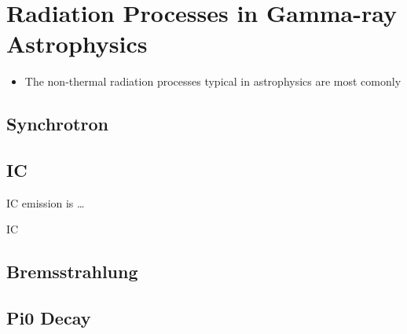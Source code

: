 
\section{Radiation Processes in Gamma-ray Astrophysics}

\begin{itemize}
  \item The non-thermal radiation processes typical
    in astrophysics are most comonly
\end{itemize}

\subsection{Synchrotron}

\subsection{\Acrlong{IC}}

\Gls{IC} emission is \ldots

\Gls{IC}

\subsection{Bremsstrahlung}

\subsection{Pi0 Decay}
